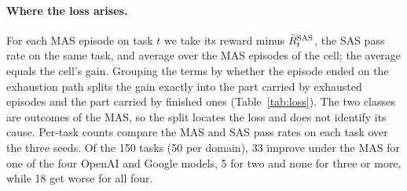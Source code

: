 \paragraph{Where the loss arises.} For each MAS episode on task $t$ we take its reward minus $\bar R^{\text{\textup{SAS}}}_{t}$, the SAS pass rate on the same task, and average over the MAS episodes of the cell; the average equals the cell's gain. Grouping the terms by whether the episode ended on the exhaustion path splits the gain exactly into the part carried by exhausted episodes and the part carried by finished ones (Table~\ref{tab:loss}). The two classes are outcomes of the MAS, so the split locates the loss and does not identify its cause. Per-task counts compare the MAS and SAS pass rates on each task over the three seeds. Of the 150 tasks (50 per domain), 33 improve under the MAS for one of the four OpenAI and Google models, 5 for two and none for three or more, while 18 get worse for all four.

